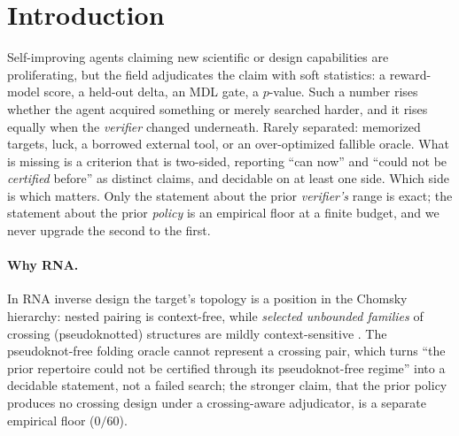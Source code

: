 \documentclass[11pt]{article}
\begin{document}
\begin{abstract}
\textbf{The ceiling on all of it is the panel itself.} Its three predictors share nearest-neighbour
thermodynamic parameters, and two agree at $\kappa{=}0.673$ on our own calibration set, so ``held out'' means
held out of the optimization loop and \emph{not} mechanistically independent. A predictor from a different
model class is the experiment this study most owes. The audit is as unsparing about our own system. Matched
undirected search is an exact zero, a search-free probe puts $84\%$ of our headline effect on targets a random
sequence already solves, and the honest description of our operator is a stochastic search with a better
success predicate and no better guidance. That is the instrument working on its author.
\end{abstract}


\section{Introduction}\label{sec:intro}
Self-improving agents claiming new scientific or design capabilities are proliferating, but the field
adjudicates the claim with soft statistics: a reward-model score, a held-out delta, an MDL gate, a $p$-value.
Such a number rises whether the agent acquired something or merely searched harder, and it rises equally when
the \emph{verifier} changed underneath. Rarely separated: memorized targets, luck, a borrowed external tool,
or an over-optimized fallible oracle. What is missing is a criterion that is two-sided, reporting ``can now''
and ``could not be \emph{certified} before'' as distinct claims, and decidable on at least one side. Which side is which matters. Only the statement about the prior \emph{verifier's} range is exact; the statement
about the prior \emph{policy} is an empirical floor at a finite budget, and we never upgrade the second to the
first.

\paragraph{Why RNA.} In RNA inverse design the target's topology is a position in the Chomsky hierarchy:
nested pairing is context-free, while \emph{selected unbounded families} of crossing (pseudoknotted)
structures are mildly context-sensitive \citep{rivaseddy2000,nebelweinberg,katosekikasami2006}. The
pseudoknot-free folding oracle cannot represent a crossing pair, which turns ``the prior repertoire could not
be certified through its pseudoknot-free regime'' into a decidable statement, not a failed search; the
stronger claim, that the prior policy produces no crossing design under a crossing-aware adjudicator, is a
separate empirical floor ($0/60$).
\end{document}
